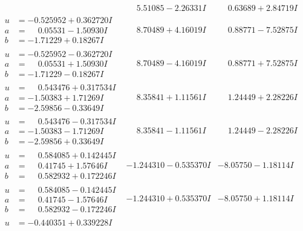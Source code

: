 \documentclass[1p]{elsarticle_modified}
\theoremstyle{definition}
\begin{document}
$$\begin{array}{c|c|c}
 & \phantom{-}5.51085 - 2.26331 I & \phantom{-}0.63689 + 2.84719 I \\ \hline\begin{aligned}
u &= -0.525952 + 0.362720 I \\
a &= \phantom{-}0.05531 - 1.50930 I \\
b &= -1.71229 + 0.18267 I\end{aligned}
 & \phantom{-}8.70489 + 4.16019 I & \phantom{-}0.88771 - 7.52875 I \\ \hline\begin{aligned}
u &= -0.525952 - 0.362720 I \\
a &= \phantom{-}0.05531 + 1.50930 I \\
b &= -1.71229 - 0.18267 I\end{aligned}
 & \phantom{-}8.70489 - 4.16019 I & \phantom{-}0.88771 + 7.52875 I \\ \hline\begin{aligned}
u &= \phantom{-}0.543476 + 0.317534 I \\
a &= -1.50383 + 1.71269 I \\
b &= -2.59856 - 0.33649 I\end{aligned}
 & \phantom{-}8.35841 + 1.11561 I & \phantom{-}1.24449 + 2.28226 I \\ \hline\begin{aligned}
u &= \phantom{-}0.543476 - 0.317534 I \\
a &= -1.50383 - 1.71269 I \\
b &= -2.59856 + 0.33649 I\end{aligned}
 & \phantom{-}8.35841 - 1.11561 I & \phantom{-}1.24449 - 2.28226 I \\ \hline\begin{aligned}
u &= \phantom{-}0.584085 + 0.142445 I \\
a &= \phantom{-}0.41745 + 1.57646 I \\
b &= \phantom{-}0.582932 + 0.172246 I\end{aligned}
 & -1.244310 - 0.535370 I & -8.05750 - 1.18114 I \\ \hline\begin{aligned}
u &= \phantom{-}0.584085 - 0.142445 I \\
a &= \phantom{-}0.41745 - 1.57646 I \\
b &= \phantom{-}0.582932 - 0.172246 I\end{aligned}
 & -1.244310 + 0.535370 I & -8.05750 + 1.18114 I \\ \hline\begin{aligned}
u &= -0.440351 + 0.339228 I \\

\end{aligned}
\end{array}$$
\end{document}
